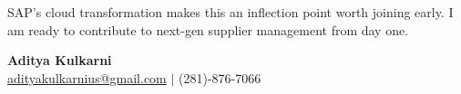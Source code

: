 \documentclass[11pt,letterpaper]{article}
\begin{document}
\vspace{8pt}

SAP's cloud transformation makes this an inflection point worth joining early. I am ready to contribute to next-gen supplier management from day one.

\vspace{12pt}

{\color{SAPBlue} \textbf{Aditya Kulkarni}} \\
\href{mailto:adityakulkarnius@gmail.com}{adityakulkarnius@gmail.com} \quad $|$ \quad (281)-876-7066
\end{document}
